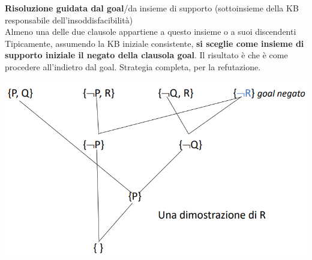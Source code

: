 \documentclass[10pt]{book}
\begin{document}
\begin{list}{}{}
\begin{center}
	\end{center}
	\item \textbf{Risoluzione guidata dal goal}/da insieme di supporto (sottoinsieme della KB responsabile dell'insoddisfacibilità)\\
	Almeno una delle due clausole appartiene a questo insieme o a suoi discendenti\\
	Tipicamente, assumendo la KB iniziale consistente, \textbf{si sceglie come insieme di supporto iniziale il negato della clausola goal}. Il risultato è che è come procedere all'indietro dal goal. Strategia completa, per la refutazione.\\
	\begin{center}
		\includegraphics[scale=0.5]{risgoal.png}
	\end{center}
\end{list}
\pagebreak
\end{document}
